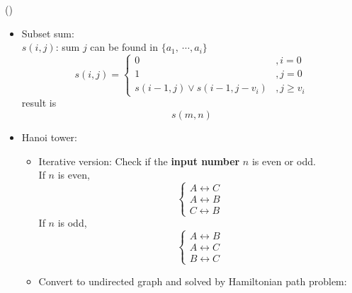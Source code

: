 \begin{theorem}{()}
\begin{itemize}
        \item Subset sum: \\
        $s(i, j)$: sum $j$ can be found in $\{a_1, \ \cdots, a_i\}$ \begin{equation}
            s(i, j) = \begin{cases}
                0 &, i = 0 \\
                1 &, j = 0 \\
                s(i - 1, j) \lor s(i - 1, j - v_i) &, j \ge v_i
            \end{cases}
        \end{equation} result is \begin{equation}
            s(m, n)
        \end{equation}
        \item Hanoi tower:
        \begin{itemize}
            \item Iterative version: Check if the \textbf{input number} $n$ is even or odd. \\ 
                If $n$ is even, \begin{equation}
                    \begin{cases}
                        A \leftrightarrow C \\
                        A \leftrightarrow B \\
                        C \leftrightarrow B
                    \end{cases} 
                \end{equation} If $n$ is odd, \begin{equation}
                    \begin{cases}
                        A \leftrightarrow B \\
                        A \leftrightarrow C \\
                        B \leftrightarrow C
                    \end{cases} 
                \end{equation}
            \item Convert to undirected graph and solved by Hamiltonian path problem: 
                \begin{figure}[H]
                    \centering

\end{figure}
\end{itemize}
\end{itemize}
\end{theorem}
